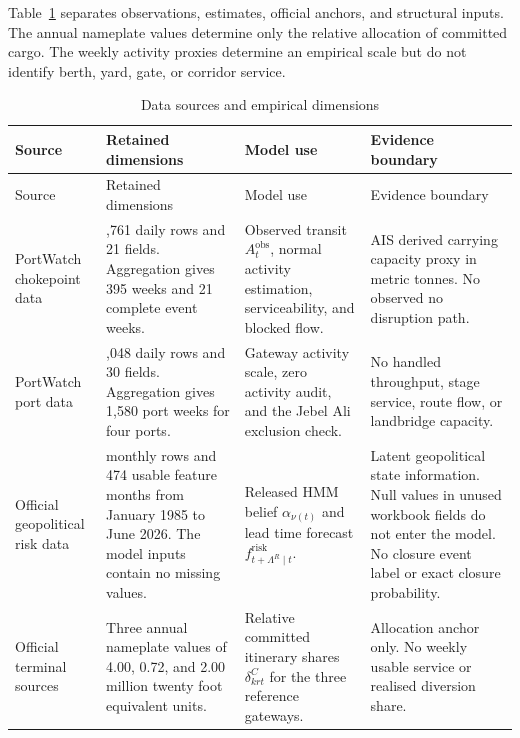 \documentclass[a4paper,fleqn]{cas-sc}
\begin{document}
Table~\ref{tab:data-evidence-84} separates observations, estimates, official
anchors, and structural inputs. The annual nameplate values determine only the
relative allocation of committed cargo. The weekly activity proxies determine
an empirical scale but do not identify berth, yard, gate, or corridor service.

\begin{longtable}{>{\RaggedRight\arraybackslash}p{}
                  >{\RaggedRight\arraybackslash}p{}
                  >{\RaggedRight\arraybackslash}p{}
                  >{\RaggedRight\arraybackslash}p{}}
\caption{Data sources and empirical dimensions}\label{tab:data-evidence-84}\\
\toprule
Source & Retained dimensions & Model use & Evidence boundary \\
\midrule
\endfirsthead
\toprule
Source & Retained dimensions & Model use & Evidence boundary \\
\midrule
\endhead
PortWatch chokepoint data \citep{IMFPortWatch2023,IMFPortWatchMethod2025}
& 2,761 daily rows and 21 fields. Aggregation gives 395 weeks and 21 complete event weeks.
& Observed transit $A_t^{\mathrm{obs}}$, normal activity estimation, serviceability, and blocked flow.
& AIS derived carrying capacity proxy in metric tonnes. No observed no disruption path. \\
PortWatch port data \citep{IMFPortWatch2023,IMFPortWatchMethod2025}
& 11,048 daily rows and 30 fields. Aggregation gives 1,580 port weeks for four ports.
& Gateway activity scale, zero activity audit, and the Jebel Ali exclusion check.
& No handled throughput, stage service, route flow, or landbridge capacity. \\
Official geopolitical risk data \citep{CaldaraIacoviello2022}
& 498 monthly rows and 474 usable feature months from January 1985 to June 2026. The model inputs contain no missing values.
& Released HMM belief $\alpha_{\nu(t)}$ and lead time forecast $f^{\mathrm{risk}}_{t+\Lambda^R\mid t}$.
& Latent geopolitical state information. Null values in unused workbook fields do not enter the model. No closure event label or exact closure probability. \\
Official terminal sources \citep{Gulftainer2025,ADPorts2021,Asyad2026}
& Three annual nameplate values of 4.00, 0.72, and 2.00 million twenty foot equivalent units.
& Relative committed itinerary shares $\delta^C_{krt}$ for the three reference gateways.
& Allocation anchor only. No weekly usable service or realised diversion share. \\

\end{longtable}
\end{document}
